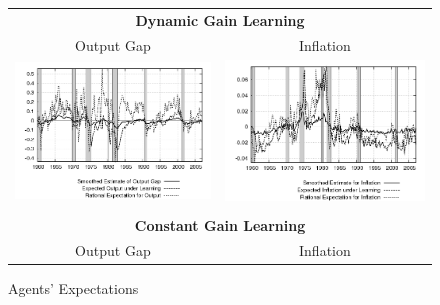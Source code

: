 \begin{figure}[ht]
\caption{Agents' Expectations}\label{fg3:exp}
\begin{center}
\begin{tabular}{cc}
\multicolumn{2}{c}{\textbf{Dynamic Gain Learning}} \\
Output Gap & Inflation \\
\includegraphics[scale=0.4]{results_dg8_wlsinit/output_expre.png} & \includegraphics[scale=0.4]{results_dg8_wlsinit/inflation_expre.png} \\\\
\multicolumn{2}{c}{\textbf{Constant Gain Learning}} \\
Output Gap & Inflation \\

\end{tabular}
\end{center}
\end{figure}
